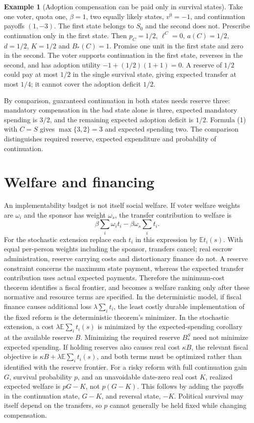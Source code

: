 \documentclass[11pt]{article}
\theoremstyle{definition}
\newtheorem{example}{Example}
\begin{document}
\begin{example}[Adoption compensation can be paid only in survival states]
Take one voter, quota one, $\beta=1$, two equally likely states,
$v^0=-1$, and continuation payoffs $(1,-3)$. The first state belongs
to $S_0$ and the second does not. Prescribe continuation only in the
first state. Then $p_C=1/2$, $\ell^C=0$, $a(C)=1/2$, $d=1/2$,
$K=1/2$ and $B_*(C)=1$. Promise one unit in the first state and zero
in the second. The voter supports continuation in the first state,
reverses in the second, and has adoption utility
$-1+(1/2)(1+1)=0$. A reserve of $1/2$ could pay at most $1/2$ in
the single survival state, giving expected transfer at most $1/4$;
it cannot cover the adoption deficit $1/2$.

By comparison, guaranteed continuation in both states needs reserve
three: mandatory compensation in the bad state alone is three,
expected mandatory spending is $3/2$, and the remaining expected
adoption deficit is $1/2$. Formula (1) with $C=S$ gives
$\max\{3,2\}=3$ and expected spending two. The comparison distinguishes
required reserve, expected expenditure and probability of continuation.
\end{example}

\section*{Welfare and financing}
An implementability budget is not itself social welfare. If voter welfare weights are $\omega_i$ and the sponsor has weight $\omega_s$, the transfer contribution to welfare is
\[
 \beta\sum_i\omega_i t_i-\beta\omega_s\sum_i t_i.
\]
For the stochastic extension replace each $t_i$ in this expression by $\mathbb E t_i(s)$. With equal per-person weights including the sponsor, transfers cancel; real escrow administration, reserve carrying costs and distortionary finance do not. A reserve constraint concerns the maximum state payment, whereas the expected transfer contribution uses actual expected payments. Therefore the minimum-cost theorem identifies a fiscal frontier, and becomes a welfare ranking only after these normative and resource terms are specified. In the deterministic model, if fiscal finance causes additional loss $\lambda\sum_i t_i$, the least costly durable implementation of the fixed reform is the deterministic theorem's minimizer. In the stochastic extension, a cost $\lambda\mathbb E\sum_i t_i(s)$ is minimized by the expected-spending corollary at the available reserve $B$. Minimizing the required reserve $B_*^S$ need not minimize expected spending. If holding reserves also causes real cost $\kappa B$, the relevant fiscal objective is $\kappa B+\lambda\mathbb E\sum_i t_i(s)$, and both terms must be optimized rather than identified with the reserve frontier.
For a risky reform with full continuation gain $G$, survival probability $p$, and an unavoidable date-zero real cost $K$, realized expected welfare is $pG-K$, not $p(G-K)$. This follows by adding the payoffs in the continuation state, $G-K$, and reversal state, $-K$. Political survival may itself depend on the transfers, so $p$ cannot generally be held fixed while changing compensation.
\end{document}
